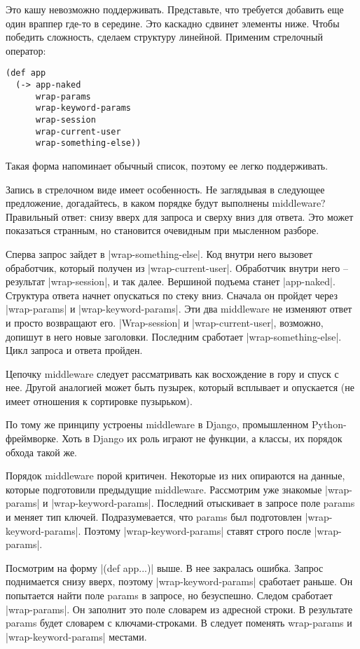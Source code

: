 Это кашу невозможно поддерживать. Представьте, что требуется добавить еще один
враппер где-то в середине. Это каскадно сдвинет элементы ниже. Чтобы победить
сложность, сделаем структуру линейной. Применим стрелочный оператор:

\begin{verbatim}
(def app
  (-> app-naked
      wrap-params
      wrap-keyword-params
      wrap-session
      wrap-current-user
      wrap-something-else))
\end{verbatim}

Такая форма напоминает обычный список, поэтому ее легко поддерживать.

Запись в стрелочном виде имеет особенность. Не заглядывая в следующее
предложение, догадайтесь, в каком порядке будут выполнены middleware? Правильный
ответ: снизу вверх для запроса и сверху вниз для ответа. Это может показаться
странным, но становится очевидным при мысленном разборе.

Сперва запрос зайдет в \spverb|wrap-something-else|. Код внутри него вызовет
обработчик, который получен из \spverb|wrap-current-user|. Обработчик внутри него –
результат \spverb|wrap-session|, и так далее. Вершиной подъема станет
\spverb|app-naked|. Структура ответа начнет опускаться по стеку вниз. Сначала он
пройдет через \spverb|wrap-params| и \spverb|wrap-keyword-params|. Эти два middleware не
изменяют ответ и просто возвращают его. \spverb|Wrap-session| и \spverb|wrap-current-user|,
возможно, допишут в него новые заголовки. Последним сработает
\spverb|wrap-something-else|. Цикл запроса и ответа пройден.

Цепочку middleware следует рассматривать как восхождение в гору и спуск с
нее. Другой аналогией может быть пузырек, который всплывает и опускается (не
имеет отношения к сортировке пузырьком).

По тому же принципу устроены middleware в Django, промышленном
Python-фреймворке. Хоть в Django их роль играют не функции, а классы, их порядок
обхода такой же.

Порядок middleware порой критичен. Некоторые из них опираются на данные, которые
подготовили предыдущие middleware. Рассмотрим уже знакомые \spverb|wrap-params| и
\spverb|wrap-keyword-params|. Последний отыскивает в запросе поле params и меняет тип
ключей. Подразумевается, что params был подготовлен
\spverb|wrap-keyword-params|. Поэтому \spverb|wrap-keyword-params| ставят строго после
\spverb|wrap-params|.

Посмотрим на форму \spverb|(def app...)| выше. В нее закралась ошибка. Запрос
поднимается снизу вверх, поэтому \spverb|wrap-keyword-params| сработает раньше. Он
попытается найти поле params в запросе, но безуспешно. Следом сработает
\spverb|wrap-params|. Он заполнит это поле словарем из адресной строки. В результате
params будет словарем с ключами-строками. В следует поменять wrap-params и
\spverb|wrap-keyword-params| местами.

